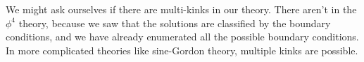 \documentclass[a4paper]{article}
\begin{document}
%
%
%
%
%
%
%

We might ask ourselves if there are multi-kinks in our theory. There aren't in the $\phi^4$ theory, because we saw that the solutions are classified by the boundary conditions, and we have already enumerated all the possible boundary conditions. In more complicated theories like sine-Gordon theory, multiple kinks are possible.
\end{document}
